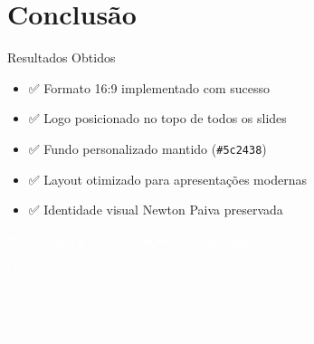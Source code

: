 \documentclass[aspectratio=169]{beamer}
\begin{document}
\section{Conclusão}
\begin{frame}{Resultados Obtidos}
    \begin{itemize}
        \item ✅ Formato 16:9 implementado com sucesso
        \item ✅ Logo posicionado no topo de todos os slides
        \item ✅ Fundo personalizado mantido (\texttt{\#5c2438})
        \item ✅ Layout otimizado para apresentações modernas
        \item ✅ Identidade visual Newton Paiva preservada
    \end{itemize}
    
    \vspace{1cm}
    \begin{center}
        \textcolor{white}{\Large\textbf{Pronto para apresentações profissionais!}}
    \end{center}
\end{frame}

\begin{frame}
    \begin{center}
        \Huge\textcolor{white}{Obrigado!}
        \vspace{1cm}
        
        \Large\textcolor{white}{Perguntas?}
        
        \vspace{1cm}
        \textcolor{white}{\small Newton Paiva - Transformando o futuro}
    \end{center}
\end{frame}
\end{document}
